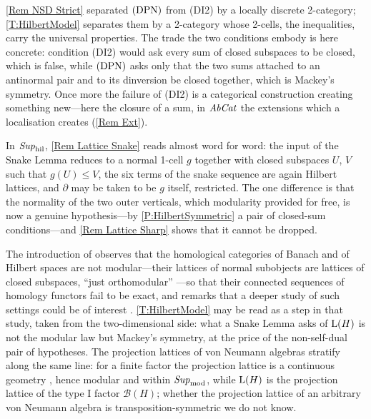 \begin{remark}
  \label{Rem NSD Hilbert}
  \remx\ref{Rem NSD Strict} separated \(\textup{(DPN)}\) from \textup{(DI2)} by a locally discrete 2-category; \thex\ref{T:HilbertModel} separates them by a 2-category whose 2-cells, the inequalities, carry the universal properties. The trade the two conditions embody is here concrete: condition \textup{(DI2)} would ask every sum of closed subspaces to be closed, which is false, while \(\textup{(DPN)}\) asks only that the two sums attached to an antinormal pair and to its dinversion be closed together, which is Mackey's symmetry. Once more the failure of \textup{(DI2)} is a categorical construction creating something new---here the closure of a sum, in \(\mathit{AbCat}\) the extensions which a localisation creates (\remx\ref{Rem Ext}).

	In \(\mathit{Sup}_{\mathrm{hil}}\), \remx\ref{Rem Lattice Snake} reads almost word for word: the input of the Snake Lemma reduces to a normal 1-cell \(g\) together with closed subspaces \(U\), \(V\) such that \(g(U)\leq V\), the six terms of the snake sequence are again Hilbert lattices, and \(\partial\) may be taken to be \(g\) itself, restricted. The one difference is that the normality of the two outer verticals, which modularity provided for free, is now a genuine hypothesis---by \prox\ref{P:HilbertSymmetric} a pair of closed-sum conditions---and \remx\ref{Rem Lattice Sharp} shows that it cannot be dropped.

	The introduction of \cite{Grandis-HA2} observes that the homological categories of Banach and of Hilbert spaces are not modular---their lattices of normal subobjects are lattices of closed subspaces, ``just orthomodular'' \cite[2.3.2]{Grandis-HA2}---so that their connected sequences of homology functors fail to be exact, and remarks that a deeper study of such settings could be of interest \cite[0.4]{Grandis-HA2}. \thex\ref{T:HilbertModel} may be read as a step in that study, taken from the two-dimensional side: what a Snake Lemma asks of \(\mathrm{L}(H)\) is not the modular law but Mackey's symmetry, at the price of the non-self-dual pair of hypotheses. The projection lattices of von Neumann algebras stratify along the same line: for a finite factor the projection lattice is a continuous geometry \cite{vNeu60}, hence modular and within \(\mathit{Sup}_{\mathrm{mod}}\), while \(\mathrm{L}(H)\) is the projection lattice of the type \(\mathrm{I}\) factor \(\mathcal{B}(H)\); whether the projection lattice of an arbitrary von Neumann algebra is transposition-symmetric we do not know.
\end{remark}

